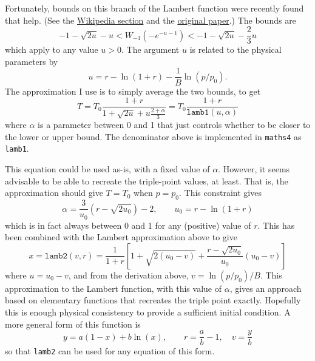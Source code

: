 \documentclass{article}
\begin{document}
Fortunately, bounds on this branch of the Lambert function were recently found that help. (See the \href{https://en.wikipedia.org/wiki/Lambert_W_function#Asymptotic_expansions}{Wikipedia section} and the \href{https://arxiv.org/abs/1601.04895}{original paper}.) The bounds are
\begin{equation*}
    -1 - \sqrt{2u} - u < W_{-1}\left( -e^{-u-1} \right) < -1 - \sqrt{2u} - \frac{2}{3} u
\end{equation*}
which apply to any value $u > 0$. The argument $u$ is related to the physical parameters by
\begin{equation*}
    u = r - \ln(1+r) - \frac{1}{B} \ln(p/p_0).
\end{equation*}
The approximation I use is to simply average the two bounds, to get
\begin{equation}\label{eqn:lamb1}
    T = T_0 \frac{1+r}{1 + \sqrt{2u} + u \frac{2 + \alpha}{3}} = T_0 \frac{1+r}{\texttt{lamb1}(u,\alpha)}
\end{equation}
where $\alpha$ is a parameter between 0 and 1 that just controls whether to be closer to the lower or upper bound. The denominator above is implemented in \texttt{maths4} as \texttt{lamb1}.

This equation could be used as-is, with a fixed value of $\alpha$. However, it seems advisable to be able to recreate the triple-point values, at least. That is, the approximation should give $T=T_0$ when $p=p_0$. This constraint gives
\begin{equation}\label{eqn:alpha}
    \alpha = \frac{3}{u_0} (r - \sqrt{2 u_0}) - 2, \qquad u_0 = r - \ln(1+r)
\end{equation}
which is in fact always between 0 and 1 for any (positive) value of $r$. This has been combined with the Lambert approximation above to give
\begin{equation}\label{eqn:lamb2}
    x = \texttt{lamb2}(v,r) = \frac{1}{1+r} \left[ 1 + \sqrt{2(u_0-v)} + \frac{r - \sqrt{2 u_0}}{u_0} (u_0-v) \right]
\end{equation}
where $u = u_0 - v$, and from the derivation above, $v = \ln(p/p_0)/B$. This approximation to the Lambert function, with this value of $\alpha$, gives an approach based on elementary functions that recreates the triple point exactly. Hopefully this is enough physical consistency to provide a sufficient initial condition. A more general form of this function is
\begin{equation}\label{eqn:lamb3}
    y = a (1-x) + b \ln(x), \qquad r = \frac{a}{b}-1, \quad v = \frac{y}{b}
\end{equation}
so that \texttt{lamb2} can be used for any equation of this form.
\end{document}
